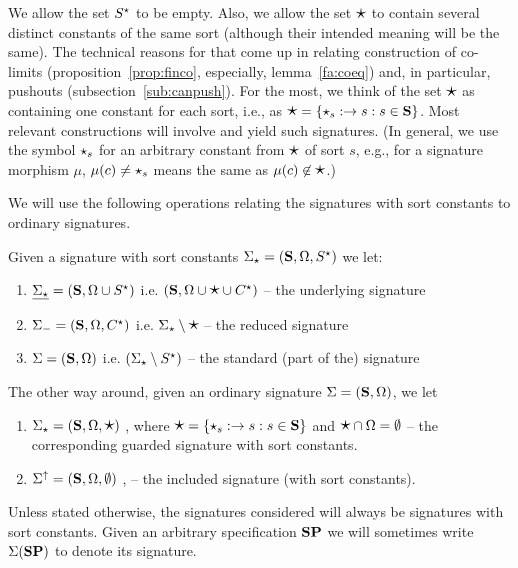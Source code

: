 We allow the set $S^\star$ to be empty. Also, we allow the set
$\mbox{\Large{$\star$}}$ to contain several distinct constants of the same sort (although
their intended meaning will be the same).
The technical reasons for that come up in relating construction of co-limits
(proposition~\ref{prop:finco}, especially, lemma~\ref{fa:coeq}) and, in particular, pushouts
(subsection~\ref{sub:canpush}). For the most, we think of the set
$\mbox{\Large{$\star$}}$ as containing one constant for each sort, i.e., as
$\mbox{\Large{$\star$}}=\{\star_s:\to s : s\in{\bf S}\}$. Most relevant constructions will
involve and yield such signatures. (In general, we use the symbol $\star_s$
for an arbitrary constant from $\mbox{\Large{$\star$}}$ of sort $s$, e.g., for a signature
morphism $\mu$, 
$\mu(c)\not=\star_s$ means the same as $\mu(c)\not\in\mbox{\Large{$\star$}}$.)


We will use the following operations relating the signatures with sort
 constants to ordinary signatures.

\begin{definition}\label{def:sigops}
Given a signature with sort constants $\Sigma_\star=({\bf S},\Omega,S^\star)$ we let:
\begin{enumerate}\MyLPar
\item $\underline{\Sigma_\star}=({\bf S},\Omega \cup S^\star)$
i.e. $({\bf S}, \Omega \cup \mbox{\Large{$\star$}} \cup C^\star)$ -- the underlying signature
\item ${\Sigma_-}=({\bf S},\Omega,C^\star)$ i.e. $\Sigma_\star
\setminus \mbox{\Large{$\star$}}$ -- the reduced signature
\item ${\Sigma}=({\bf S},\Omega)$ i.e. $(\Sigma_\star
\setminus S^\star)$ -- the standard (part of the) signature
\end{enumerate}
The other way around, given an ordinary signature $\Sigma=({\bf S},\Omega)$, we let
\begin{enumerate}\MyLPar\setcounter{enumi}{3}
\item ${\Sigma_\star}=({\bf S},\Omega,\mbox{\Large{$\star$}})$
, where   $\mbox{\Large{$\star$}}=\{\star_s:\to s:s\in{\bf S}\}$ and $\mbox{\Large{$\star$}}\cap\Omega=\emptyset$
-- the corresponding guarded signature with sort constants.
\item\label{it:ins} $\Sigma^\uparrow=({\bf S},\Omega,\emptyset)$
, -- the included signature (with sort constants).
\end{enumerate}
\end{definition}
%
Unless stated otherwise, the signatures considered will always be signatures with sort constants. 
Given an arbitrary specification ${\bf SP}$ we will sometimes write
$\Sigma({\bf SP})$ to denote its signature.

